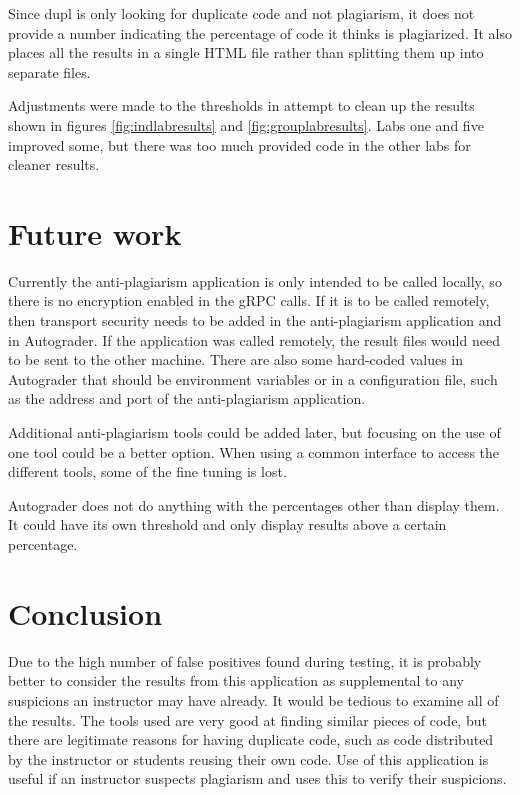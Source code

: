 \documentclass[10pt,journal,compsoc]{IEEEtran}
\begin{document}
	Since dupl is only looking for duplicate code and not plagiarism, it does not provide a number indicating the percentage of code it thinks is plagiarized. It also places all the results in a single HTML file rather than splitting them up into separate files.
	
	Adjustments were made to the thresholds in attempt to clean up the results shown in figures \ref{fig:indlabresults} and \ref{fig:grouplabresults}. Labs one and five improved some, but there was too much provided code in the other labs for cleaner results.
	
	\section{Future work}
	Currently the anti-plagiarism application is only intended to be called locally, so there is no encryption enabled in the gRPC calls. If it is to be called remotely, then transport security needs to be added in the anti-plagiarism application and in Autograder. If the application was called remotely, the result files would need to be sent to the other machine. There are also some hard-coded values in Autograder that should be environment variables or in a configuration file, such as the address and port of the anti-plagiarism application.
	
	Additional anti-plagiarism tools could be added later, but focusing on the use of one tool could be a better option. When using a common interface to access the different tools, some of the fine tuning is lost.
	
	Autograder does not do anything with the percentages other than display them. It could have its own threshold and only display results above a certain percentage.
	
	\section{Conclusion}
	Due to the high number of false positives found during testing, it is probably better to consider the results from this application as supplemental to any suspicions an instructor may have already. It would be tedious to examine all of the results. The tools used are very good at finding similar pieces of code, but there are legitimate reasons for having duplicate code, such as code distributed by the instructor or students reusing their own code. Use of this application is useful if an instructor suspects plagiarism and uses this to verify their suspicions.
	
\end{document}
